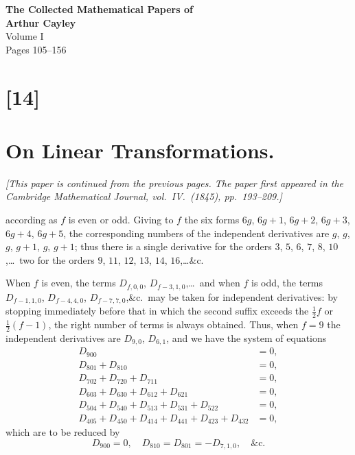 \documentclass[12pt,a4paper]{article}
\begin{document}
\begin{center}
{\LARGE\bfseries The Collected Mathematical Papers of}\\[0.5em]
{\LARGE\bfseries Arthur Cayley}\\[1em]
{\Large Volume I}\\[1em]
{\large Pages 105--156}\\[2em]
\end{center}

\tableofcontents
\newpage


\section*{[14]}
\section*{On Linear Transformations.}

\textit{[This paper is continued from the previous pages. The paper first appeared in the}
\textit{Cambridge Mathematical Journal, vol.~IV.~(1845), pp.~193--209.]}

\bigskip
\setcounter{page}{105}

according as $f$ is even or odd. Giving to $f$ the six forms
$6g$, $6g+1$, $6g+2$, $6g+3$, $6g+4$, $6g+5$,
the corresponding numbers of the independent derivatives are
$g$, $g$, $g$, $g+1$, $g$, $g+1$;
thus there is a single derivative for the orders $3$, $5$, $6$, $7$, $8$, $10$,\ldots\ two for the orders
$9$, $11$, $12$, $13$, $14$, $16$,\ldots\&c.

When $f$ is even, the terms $D_{f,0,0}$, $D_{f-3,1,0}$,\ldots\ and when $f$
is odd, the terms
$D_{f-1,1,0}$, $D_{f-4,4,0}$, $D_{f-7,7,0}$,\&c.\ may be taken for independent derivatives: by stopping
immediately before that in which the second suffix exceeds the $\frac{1}{2}f$ or
$\frac{1}{2}(f-1)$, the right number
of terms is always obtained. Thus, when $f=9$ the independent derivatives are $D_{9,0}$,
$D_{6,1}$, and we have the system of equations
\begin{align*}
D_{900} &= 0,\\
D_{801} + D_{810} &= 0,\\
D_{702} + D_{720} + D_{711} &= 0,\\
D_{603} + D_{630} + D_{612} + D_{621} &= 0,\\
D_{504} + D_{540} + D_{513} + D_{531} + D_{522} &= 0,\\
D_{405} + D_{450} + D_{414} + D_{441} + D_{423} + D_{432} &= 0,
\end{align*}
which are to be reduced by
\[
D_{900} = 0,\quad
D_{810} = D_{801} = -D_{7,1,0},\quad \&\text{c.}
\]
\end{document}
